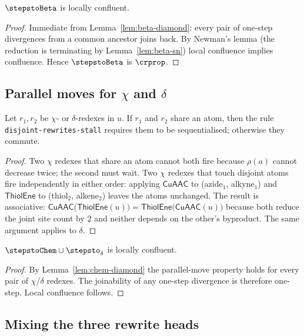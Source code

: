\begin{lemma}
\label{lem:beta-lc}
$\stepstoBeta$ is locally confluent.
\end{lemma}
\begin{proof}
Immediate from Lemma~\ref{lem:beta-diamond}: every pair of one-step
divergences from a common ancestor joins back. By Newman's lemma (the
reduction is terminating by Lemma~\ref{lem:beta-sn}) local confluence
implies confluence. Hence $\stepstoBeta$ is $\crprop$.
\end{proof}

\subsection{Parallel moves for $\chi$ and $\delta$}

\begin{lemma}
\label{lem:chem-diamond}
Let $r_1, r_2$ be $\chi$- or $\delta$-redexes in $u$. If $r_1$ and $r_2$
share an atom, then the rule \texttt{disjoint-rewrites-stall} requires them
to be sequentialised; otherwise they commute.
\end{lemma}
\begin{proof}
Two $\chi$ redexes that share an atom cannot both fire because
$\rho(a)$ cannot decrease twice; the second must wait. Two $\chi$ redexes
that touch disjoint atoms fire independently in either order: applying
$\mathsf{CuAAC}$ to (azide$_1$, alkyne$_1$) and $\mathsf{ThiolEne}$ to
(thiol$_2$, alkene$_2$) leaves the atoms unchanged. The result is
associative: $\mathsf{CuAAC}\bigl(\mathsf{ThiolEne}(u)\bigr)
       = \mathsf{ThiolEne}\bigl(\mathsf{CuAAC}(u)\bigr)$
because both reduce the joint site count by $2$ and neither depends on
the other's byproduct. The same argument applies to $\delta$.
\end{proof}

\begin{lemma}
\label{lem:chem-lc}
$\stepstoChem \cup \stepsto_\delta$ is locally confluent.
\end{lemma}
\begin{proof}
By Lemma~\ref{lem:chem-diamond} the parallel-move property holds for every
pair of $\chi$/$\delta$ redexes. The joinability of any one-step
divergence is therefore one-step. Local confluence follows.
\end{proof}

\subsection{Mixing the three rewrite heads}

